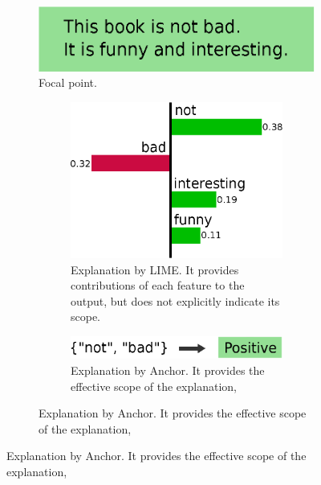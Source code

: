 \documentclass[11pt]{article}
\begin{document}
\begin{figure}[tbp]
	\def\scale{0.38}
	\centering
	\vspace{0.5cm}
	\begin{subfigure}[t]{0.55\textwidth}
		\centering
		\includegraphics[scale=\scale]{example-instance}
		\caption{Focal point.}\label{fig:example-instance}
	\end{subfigure}
	\hfill
	\begin{subfigure}[t]{0.45\textwidth}
		\begin{subfigure}[t]{\textwidth}
			\centering
			\includegraphics[scale=\scale]{example-lime}
			\caption{%
				Explanation by LIME\@.
				It provides contributions of each feature to the output,
				but does not explicitly indicate its scope.
			}\label{fig:example-lime}
			\vspace{0.4cm}
		\end{subfigure}
		\begin{subfigure}[t]{\textwidth}
			\centering
			\includegraphics[scale=\scale]{example-anchor}
			\caption{%
				Explanation by Anchor.
				It provides the effective scope of the explanation,
}
\end{subfigure}
\end{subfigure}
\end{figure}
\end{document}
